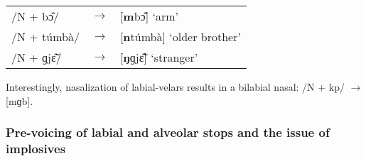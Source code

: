 \iffalse

\begin{math}
\left[
\begin{array}{l}
+\mbox{nasal} \\
+\mbox{consonant}
\end{array}
\right]
\longrightarrow 
\left[
\begin{array}{l}
+\mbox{nasal} \\
+\mbox{consonant} \\
+\mbox{articulation place x}
\end{array}
\right]
\left. \middle/ 
\right.
\end{math} %
\setul{.5cm}{.4pt}%
\ul{$\qquad$} 
\begin{math}
\left[
\begin{array}{l}
-\mbox{nasal} \\
+\mbox{consonant}  \\
+\mbox{place x} 
\end{array}
\right]
\end{math}

\fi

\ea \label{Nassimil}
\begin{tabular}{lll}
/N +  bɔ̂/ & $\rightarrow$ & [{\bfseries m}bɔ̂] `arm' \\
/N + túmbà/ & $\rightarrow$ & [{\bfseries n}túmbà] `older brother'  \\
/N + ɡjɛ̃̂/ &  $\rightarrow$ & [{\bfseries ŋ}ɡjɛ̃̂] `stranger' \\
\end{tabular}
\z


Interestingly, nasalization of labial-velars results in a bilabial nasal: /N + kp/ $\rightarrow$ [mɡb]. 






\subsubsection[Pre-voicing of labial and alveolar stops]{Pre-voicing of labial and alveolar stops and the issue of implosives}
\label{sec:Pre-glott}

